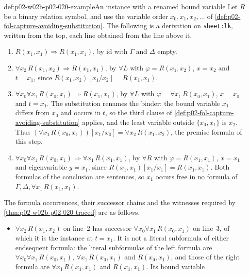 \begin{hbexample}{def:p02-w02b-p02-020-example}{An instance with a renamed bound variable}
Let \(R\) be a binary relation symbol, and use the variable order
\(x_0,x_1,x_2,\ldots\) of
\cref{def:p02-fol-capture-avoiding-substitution}.  The following is a
derivation on \texttt{sheet:lk}, written from the top,
each line obtained from the line above it.
\begin{enumerate}
  \item \(R(x_1,x_1)\Rightarrow R(x_1,x_1)\), by \(\mathrm{id}\) with
        \(\Gamma\) and \(\Delta\) empty.
  \item \(\forall x_2\,R(x_1,x_2)\Rightarrow R(x_1,x_1)\), by \(\forall L\)
        with \(\varphi=R(x_1,x_2)\), \(x=x_2\) and \(t=x_1\), since
        \(R(x_1,x_2)[x_1/x_2]=R(x_1,x_1)\).
  \item \(\forall x_0\forall x_1\,R(x_0,x_1)\Rightarrow R(x_1,x_1)\), by
        \(\forall L\) with \(\varphi=\forall x_1\,R(x_0,x_1)\), \(x=x_0\) and
        \(t=x_1\).  The substitution renames the binder: the bound variable
        \(x_1\) differs from \(x_0\) and occurs in \(t\), so the third clause
        of \cref{def:p02-fol-capture-avoiding-substitution} applies, and the
        least variable outside \(\{x_0,x_1\}\) is \(x_2\).  Thus
        \((\forall x_1\,R(x_0,x_1))[x_1/x_0]=\forall x_2\,R(x_1,x_2)\), the
        premise formula of this step.
  \item \(\forall x_0\forall x_1\,R(x_0,x_1)\Rightarrow\forall x_1\,R(x_1,x_1)\),
        by \(\forall R\) with \(\varphi=R(x_1,x_1)\), \(x=x_1\) and
        eigenvariable \(y=x_1\), since \(R(x_1,x_1)[x_1/x_1]=R(x_1,x_1)\).
        Both formulas of the conclusion are sentences, so \(x_1\) occurs free
        in no formula of \(\Gamma,\Delta,\forall x_1\,R(x_1,x_1)\).
\end{enumerate}
The formula occurrences, their successor chains and the witnesses required by
\cref{thm:p02-w02b-p02-020-traced} are as follows.
\begin{itemize}
  \item \(\forall x_2\,R(x_1,x_2)\) on line~2 has successor
        \(\forall x_0\forall x_1\,R(x_0,x_1)\) on line~3, of which it is the
        instance at \(t=x_1\).  It is not a literal subformula of either
        endsequent formula: the literal subformulas of the left formula are
        \(\forall x_0\forall x_1\,R(x_0,x_1)\), \(\forall x_1\,R(x_0,x_1)\)
        and \(R(x_0,x_1)\), and those of the right formula are
        \(\forall x_1\,R(x_1,x_1)\) and \(R(x_1,x_1)\).  Its bound variable

\end{itemize}
\end{hbexample}
